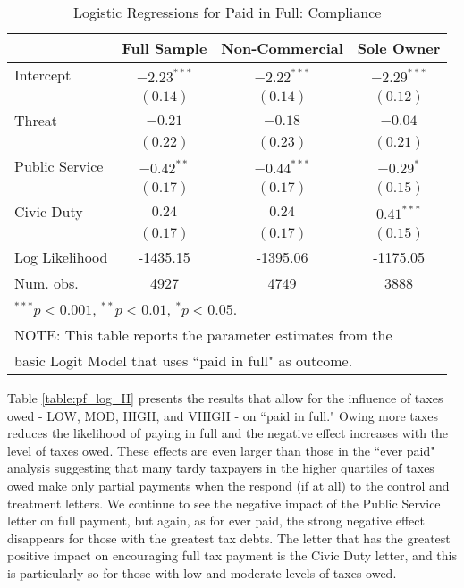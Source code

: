 \documentclass[12pt,titlepage]{article}
\begin{document}
\begin{table}[htbp]
\caption{Logistic Regressions for Paid in Full: Compliance}
\begin{center}
\begin{tabular}{l c c c }
\hline
               & Full Sample & Non-Commercial & Sole Owner \\
\hline
Intercept      & $-2.23^{***}$ & $-2.22^{***}$ & $-2.29^{***}$ \\
               & $(0.14)$      & $(0.14)$      & $(0.12)$      \\
Threat         & $-0.21$       & $-0.18$       & $-0.04$       \\
               & $(0.22)$      & $(0.23)$      & $(0.21)$      \\
Public Service & $-0.42^{**}$  & $-0.44^{***}$ & $-0.29^{*}$   \\
               & $(0.17)$      & $(0.17)$      & $(0.15)$      \\
Civic Duty     & $0.24$        & $0.24$        & $0.41^{***}$  \\
               & $(0.17)$      & $(0.17)$      & $(0.15)$      \\
\hline
Log Likelihood & -1435.15      & -1395.06      & -1175.05      \\
Num. obs.      & 4927          & 4749          & 3888          \\
\hline
\multicolumn{4}{l}{$^{***}p<0.001$, $^{**}p<0.01$, $^*p<0.05$.} \\
\multicolumn{4}{l}{NOTE: This table reports the parameter estimates from the} \\
\multicolumn{4}{l}{basic Logit Model that uses ``paid in full" as outcome.} \\
\end{tabular}
\label{table:pf_log_I}
\end{center}
\end{table}


Table \ref{table:pf_log_II} presents the results that allow for the influence of
taxes owed - LOW, MOD, HIGH, and VHIGH - on ``paid in full."  Owing more
taxes reduces the likelihood of paying in full and the negative effect
increases with the level of taxes owed.  These effects are even larger
than those in the ``ever paid" analysis suggesting that many tardy
taxpayers in the higher quartiles of taxes owed make only partial
payments when the respond (if at all) to the control and treatment
letters.  We continue to see the negative impact of the Public Service
letter on full payment, but again, as for ever paid, the strong
negative effect disappears for those with the greatest tax debts.  The
letter that has the greatest positive impact on encouraging full tax
payment is the Civic Duty letter, and this is particularly so for
those with low and moderate levels of taxes owed.
\end{document}
